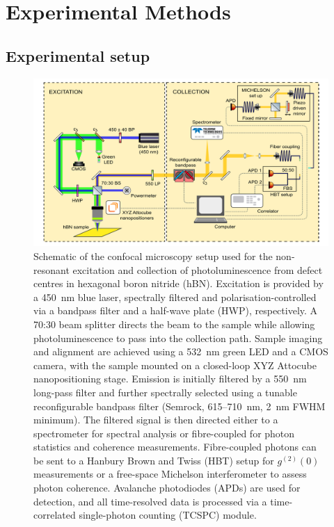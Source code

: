 \section{Experimental Methods}

\subsection{\label{sec:setup} Experimental setup}

\begin{figure}[h]
    \centering
    \includegraphics[width=1\linewidth]{Figures/ExperimentalSetUp.png}
    \caption{Schematic of the confocal microscopy setup used for the non-resonant excitation and collection of photoluminescence from defect centres in hexagonal boron nitride (hBN). Excitation is provided by a 450~nm blue laser, spectrally filtered and polarisation-controlled via a bandpass filter and a half-wave plate (HWP), respectively. A 70:30 beam splitter directs the beam to the sample while allowing photoluminescence to pass into the collection path. Sample imaging and alignment are achieved using a 532~nm green LED and a CMOS camera, with the sample mounted on a closed-loop XYZ Attocube nanopositioning stage. Emission is initially filtered by a 550~nm long-pass filter and further spectrally selected using a tunable reconfigurable bandpass filter (Semrock, 615--710~nm, 2~nm FWHM minimum). The filtered signal is then directed either to a spectrometer for spectral analysis or fibre-coupled for photon statistics and coherence measurements. Fibre-coupled photons can be sent to a Hanbury Brown and Twiss (HBT) setup for $g^{(2)}(0)$ measurements or a free-space Michelson interferometer to assess photon coherence. Avalanche photodiodes (APDs) are used for detection, and all time-resolved data is processed via a time-correlated single-photon counting (TCSPC) module.}
    \label{fig:setup}
\end{figure}

